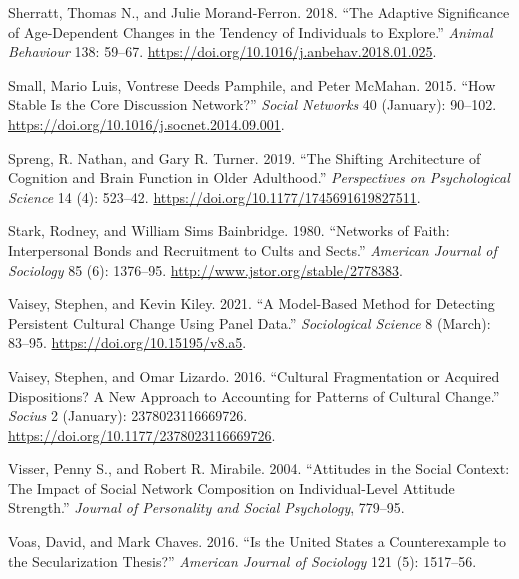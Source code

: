 \documentclass[
  12pt,
]{article}
\newlength{\cslhangindent}
\newlength{\cslentryspacingunit} %
\newenvironment{CSLReferences}[2] %
 {%
  \setlength{\parindent}{0pt}
  \ifodd #1
  \let\oldpar\par
  \def\par{\hangindent=\cslhangindent\oldpar}
  \fi
  \setlength{\parskip}{#2\cslentryspacingunit}
 }%
 {}
\begin{document}
\begin{CSLReferences}{1}{0}
\leavevmode{}%
Sherratt, Thomas N., and Julie Morand-Ferron. 2018. {``The Adaptive Significance of Age-Dependent Changes in the Tendency of Individuals to Explore.''} \emph{Animal Behaviour} 138: 59--67. \url{https://doi.org/10.1016/j.anbehav.2018.01.025}.

\leavevmode{}%
Small, Mario Luis, Vontrese Deeds Pamphile, and Peter McMahan. 2015. {``How Stable Is the Core Discussion Network?''} \emph{Social Networks} 40 (January): 90--102. \url{https://doi.org/10.1016/j.socnet.2014.09.001}.

\leavevmode{}%
Spreng, R. Nathan, and Gary R. Turner. 2019. {``The {Shifting} {Architecture} of {Cognition} and {Brain} {Function} in {Older} {Adulthood}.''} \emph{Perspectives on Psychological Science} 14 (4): 523--42. \url{https://doi.org/10.1177/1745691619827511}.

\leavevmode{}%
Stark, Rodney, and William Sims Bainbridge. 1980. {``Networks of {Faith}: {Interpersonal} {Bonds} and {Recruitment} to {Cults} and {Sects}.''} \emph{American Journal of Sociology} 85 (6): 1376--95. \url{http://www.jstor.org/stable/2778383}.

\leavevmode{}%
Vaisey, Stephen, and Kevin Kiley. 2021. {``A {Model}-{Based} {Method} for {Detecting} {Persistent} {Cultural} {Change} {Using} {Panel} {Data}.''} \emph{Sociological Science} 8 (March): 83--95. \url{https://doi.org/10.15195/v8.a5}.

\leavevmode{}%
Vaisey, Stephen, and Omar Lizardo. 2016. {``Cultural {Fragmentation} or {Acquired} {Dispositions}? {A} {New} {Approach} to {Accounting} for {Patterns} of {Cultural} {Change}.''} \emph{Socius} 2 (January): 2378023116669726. \url{https://doi.org/10.1177/2378023116669726}.

\leavevmode{}%
Visser, Penny S., and Robert R. Mirabile. 2004. {``Attitudes in the Social Context: {The} Impact of Social Network Composition on Individual-Level Attitude Strength.''} \emph{Journal of Personality and Social Psychology}, 779--95.

\leavevmode{}%
Voas, David, and Mark Chaves. 2016. {``Is the {United} {States} a {Counterexample} to the {Secularization} {Thesis}?''} \emph{American Journal of Sociology} 121 (5): 1517--56.


\end{CSLReferences}
\end{document}

